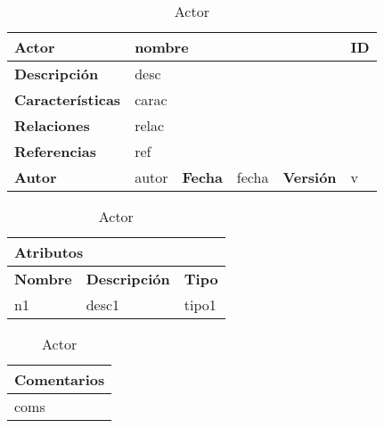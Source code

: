 \usepackage{color}
\usepackage{xcolor}
\usepackage{colortbl}
\usepackage{multirow}





\begin{table}[H]

\centering
\begin{tabular}{|m{3cm}|m{4cm}|m{2cm}|m{2cm}|m{2cm}|m{1cm}|}
\hline
\textbf{Actor} &  \multicolumn{4}{m{8cm}|}{nombre} \vline &  \cellcolor{gray!40}ID \\
\hline
\textbf{Descripción} & \multicolumn{5}{m{8cm}|}{desc} \\
\hline
\textbf{Características} & \multicolumn{5}{m{8cm}|}{carac} \\
\hline
\textbf{Relaciones} &\multicolumn{5}{m{8cm}|}{relac} \\
\hline
\textbf{Referencias} & \multicolumn{5}{m{8cm}|}{ref} \\
\hline
\textbf{Autor} & autor & \textbf{Fecha} & fecha & \textbf{Versión} & v \\
\hline
\end{tabular}

\vspace{1cm}

\begin{tabular}{|m{4cm}|m{7.3cm}|m{4cm}|}
\hline
\multicolumn{3}{|m{15.3cm}|}{\textbf{Atributos}} \\
\hline
\textbf{Nombre} & \textbf{Descripción} & \textbf{Tipo} \\
\hline
n1 & desc1 & tipo1 \\
\hline
\end{tabular}


\vspace{1cm}

\begin{tabular}{|m{16.2cm}|}
\hline
\textbf{Comentarios} \\
\hline
coms \\
\hline
\end{tabular}

\caption{Actor}

\end{table}